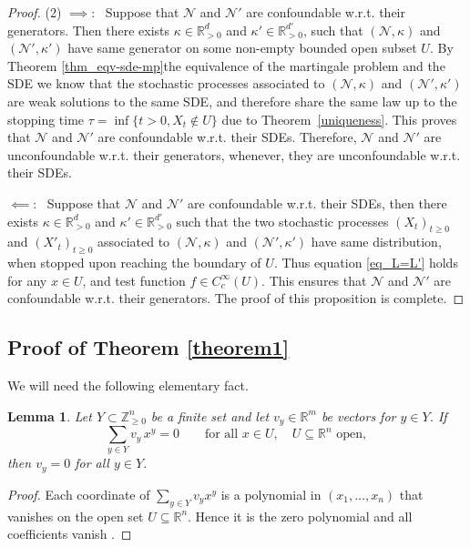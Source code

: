 \documentclass[10pt,a4paper]{amsart}
\newtheorem{lemma}[theorem]{Lemma}
\theoremstyle{definition}
\theoremstyle{remark}
\theoremstyle{consequence}
\def\cN{\mathcal{N}}
\def\R{\mathbb{R}}
\numberwithin{equation}{section}
\begin{document}
\begin{proof}
 (2) $\implies$:~
Suppose that $\cN$ and $\cN'$ are confoundable w.r.t. their generators. Then there exists $\kappa \in \R^{d}_{>0}$ and $\kappa' \in \R^{d'}_{>0}$, such that $(\cN,\kappa)$ and $(\cN',\kappa')$ have same generator on some non-empty bounded open subset $U$. By Theorem \ref{thm_eqv-sde-mp}\textemdash the equivalence of the martingale problem and the SDE \textemdash  we know that the stochastic processes
associated to $(\cN,\kappa)$ and $(\cN',\kappa')$
are weak solutions to the same SDE, and therefore share the same law up to the stopping time $\tau = \inf\{t > 0, X_{t} \notin U\}$ due to Theorem~\ref{uniqueness}. 
This proves that $\cN$ and $\cN'$ are confoundable w.r.t. their SDEs. Therefore, $\cN$ and $\cN'$ are unconfoundable w.r.t. their generators, whenever, they are unconfoundable w.r.t. their SDEs.

 $\impliedby$:~
 Suppose that $\cN$ and $\cN'$ are confoundable w.r.t. their SDEs, then there exists $\kappa \in \R^{d}_{>0}$ and $\kappa' \in \R^{d'}_{>0}$ such that the two stochastic processes $(X_t)_{t \geq 0}$ and $(X'_t)_{t \geq 0}$ associated to $(\cN,\kappa)$ and $(\cN',\kappa')$ have same distribution, when stopped upon reaching the boundary of $U$. Thus equation \eqref{eq_L=L'} holds
for any $x \in U$, and  test function $f \in C_c^{\infty} (U)$. This ensures that $\cN$ and $\cN'$ are confoundable w.r.t. their generators. The proof of this proposition is complete.
\end{proof}


\subsection{Proof of Theorem \ref{theorem1}} \label{prf_theorem1} 
We will need the following elementary fact.

\begin{lemma}\label{lem:monomial_independence}
Let $Y\subset \mathbb Z_{\ge 0}^n$ be a finite set and let $v_y\in\mathbb R^m$ be vectors for $y\in Y$. If
\[
\sum_{y\in Y} v_y\,x^y = 0 \qquad \text{for all } x\in U,\quad U\subseteq\mathbb R^n\text{ open},
\]
then $v_y=0$ for all $y\in Y$.
\end{lemma}
\begin{proof}
Each coordinate of $\sum_{y\in Y} v_y x^y$ is a polynomial in $(x_1,\dots,x_n)$ that vanishes on the open set $U\subseteq \mathbb R^n$. Hence it is the zero polynomial and all coefficients vanish \cite{mityagin2015zerosetrealanalytic}.
\end{proof}
\end{document}
